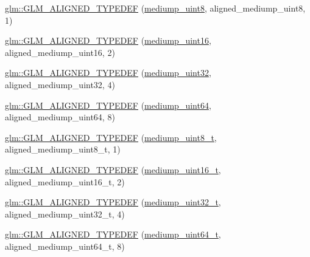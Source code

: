 \begin{DoxyCompactItemize}
\item 
\mbox{\hyperlink{group__gtx__type__aligned_ga5faf1d3e70bf33174dd7f3d01d5b883b}{glm\+::\+G\+L\+M\+\_\+\+A\+L\+I\+G\+N\+E\+D\+\_\+\+T\+Y\+P\+E\+D\+EF}} (\mbox{\hyperlink{group__gtc__type__precision_gac4b849eaac0543a10f97f4bdda4850a8}{mediump\+\_\+uint8}}, aligned\+\_\+mediump\+\_\+uint8, 1)
\item 
\mbox{\hyperlink{group__gtx__type__aligned_ga727e2bf2c433bb3b0182605860a48363}{glm\+::\+G\+L\+M\+\_\+\+A\+L\+I\+G\+N\+E\+D\+\_\+\+T\+Y\+P\+E\+D\+EF}} (\mbox{\hyperlink{group__gtc__type__precision_ga2cef3a0d7b0fce75c9885f64656d8933}{mediump\+\_\+uint16}}, aligned\+\_\+mediump\+\_\+uint16, 2)
\item 
\mbox{\hyperlink{group__gtx__type__aligned_ga12566ca66d5962dadb4a5eb4c74e891e}{glm\+::\+G\+L\+M\+\_\+\+A\+L\+I\+G\+N\+E\+D\+\_\+\+T\+Y\+P\+E\+D\+EF}} (\mbox{\hyperlink{group__gtc__type__precision_ga861dbd1051f488e425b3966001b568e5}{mediump\+\_\+uint32}}, aligned\+\_\+mediump\+\_\+uint32, 4)
\item 
\mbox{\hyperlink{group__gtx__type__aligned_ga7b66a97a8acaa35c5a377b947318c6bc}{glm\+::\+G\+L\+M\+\_\+\+A\+L\+I\+G\+N\+E\+D\+\_\+\+T\+Y\+P\+E\+D\+EF}} (\mbox{\hyperlink{group__gtc__type__precision_ga6685788d15d0a973ee7c2460d0456dc1}{mediump\+\_\+uint64}}, aligned\+\_\+mediump\+\_\+uint64, 8)
\item 
\mbox{\hyperlink{group__gtx__type__aligned_gaa9cde002439b74fa66120a16a9f55fcc}{glm\+::\+G\+L\+M\+\_\+\+A\+L\+I\+G\+N\+E\+D\+\_\+\+T\+Y\+P\+E\+D\+EF}} (\mbox{\hyperlink{group__gtc__type__precision_gadfa38f3c245d371c4b2079f1fd68928b}{mediump\+\_\+uint8\+\_\+t}}, aligned\+\_\+mediump\+\_\+uint8\+\_\+t, 1)
\item 
\mbox{\hyperlink{group__gtx__type__aligned_ga1ca98c67f7d1e975f7c5202f1da1df1f}{glm\+::\+G\+L\+M\+\_\+\+A\+L\+I\+G\+N\+E\+D\+\_\+\+T\+Y\+P\+E\+D\+EF}} (\mbox{\hyperlink{group__gtc__type__precision_ga0b385466deac5ac96061ef2cdd6db20f}{mediump\+\_\+uint16\+\_\+t}}, aligned\+\_\+mediump\+\_\+uint16\+\_\+t, 2)
\item 
\mbox{\hyperlink{group__gtx__type__aligned_ga1dc8bc6199d785f235576948d80a597c}{glm\+::\+G\+L\+M\+\_\+\+A\+L\+I\+G\+N\+E\+D\+\_\+\+T\+Y\+P\+E\+D\+EF}} (\mbox{\hyperlink{group__gtc__type__precision_gac7782c1e393f9ad47e41a177a685f287}{mediump\+\_\+uint32\+\_\+t}}, aligned\+\_\+mediump\+\_\+uint32\+\_\+t, 4)
\item 
\mbox{\hyperlink{group__gtx__type__aligned_gad14a0f2ec93519682b73d70b8e401d81}{glm\+::\+G\+L\+M\+\_\+\+A\+L\+I\+G\+N\+E\+D\+\_\+\+T\+Y\+P\+E\+D\+EF}} (\mbox{\hyperlink{group__gtc__type__precision_gaa97354d3120a6dc029a5e9563723de18}{mediump\+\_\+uint64\+\_\+t}}, aligned\+\_\+mediump\+\_\+uint64\+\_\+t, 8)

\end{DoxyCompactItemize}
